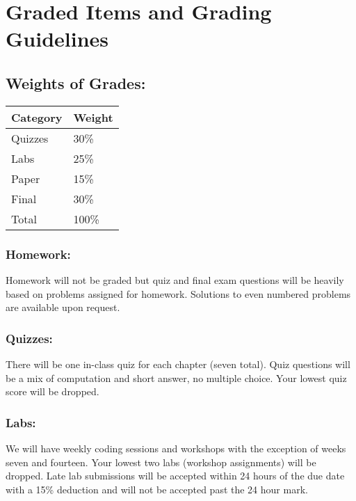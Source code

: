 \documentclass[
]{book}
\begin{document}
\hypertarget{graded-items-and-grading-guidelines}{%
\section{Graded Items and Grading Guidelines}\label{graded-items-and-grading-guidelines}}

\hypertarget{weights-of-grades}{%
\subsection{Weights of Grades:}\label{weights-of-grades}}

\begin{tabular}{l|l}
\hline
Category & Weight\\
\hline
Quizzes & 30\%\\
\hline
Labs & 25\%\\
\hline
Paper & 15\%\\
\hline
Final & 30\%\\
\hline
Total & 100\%\\
\hline
\end{tabular}

\hypertarget{homework}{%
\subsubsection{Homework:}\label{homework}}

Homework will not be graded but quiz and final exam questions will be heavily based on problems assigned for homework. Solutions to even numbered problems are available upon request.

\hypertarget{quizzes}{%
\subsubsection{Quizzes:}\label{quizzes}}

There will be one in-class quiz for each chapter (seven total). Quiz questions will be a mix of computation and short answer, no multiple choice. Your lowest quiz score will be dropped.

\hypertarget{labs}{%
\subsubsection{Labs:}\label{labs}}

We will have weekly coding sessions and workshops with the exception of weeks seven and fourteen. Your lowest two labs (workshop assignments) will be dropped. Late lab submissions will be accepted within 24 hours of the due date with a 15\% deduction and will not be accepted past the 24 hour mark.
\end{document}
